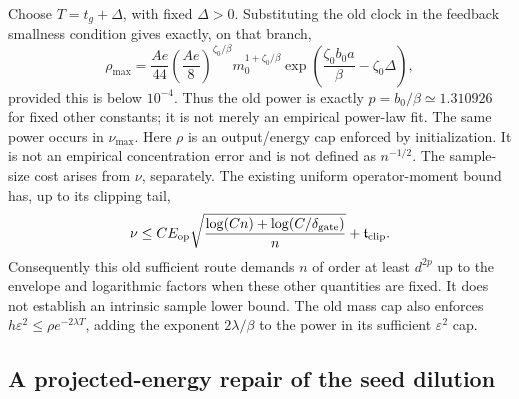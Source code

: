 \documentclass{article} %
\theoremstyle{plain}
\theoremstyle{definition}
\theoremstyle{remark}
\begin{document}
Choose $T=t_g+\Delta$, with fixed $\Delta>0$. Substituting the old clock
in the feedback smallness condition gives exactly, on that branch,
\begin{equation}\label{sbguard:old-rho}
 \rho_{\max}=
 \frac{Ae}{44}\left(\frac{Ae}{8}\right)^{\zeta_0/\beta}
 m_0^{1+\zeta_0/\beta}
 \exp\left(\frac{\zeta_0b_0a}{\beta}-\zeta_0\Delta\right),
\end{equation}
provided this is below $10^{-4}$. Thus the old power is exactly
$p=b_0/\beta\simeq1.310926$ for fixed other constants; it is not merely
an empirical power-law fit. The same power occurs in $\nu_{\max}$.
Here $\rho$ is an output/energy cap enforced by initialization. It is
not an empirical concentration error and is not defined as $n^{-1/2}$.
The sample-size cost arises from $\nu$, separately. The existing
uniform operator-moment bound has, up to its clipping tail,
\[
 \nu\le C E_{\rm op}
     \sqrt{\frac{\log(Cn)+\log(C/\delta_{\rm gate})}{n}}
                 +\mathfrak t_{\rm clip}.
\]
Consequently this old sufficient route demands $n$ of order at least
$d^{2p}$ up to the envelope and logarithmic factors when these other
quantities are fixed. It does not establish an intrinsic sample lower
bound. The old mass cap also enforces
$h\varepsilon^2\le\rho e^{-2\lambda T}$, adding the exponent
$2\lambda/\beta$ to the power in its sufficient $\varepsilon^2$ cap.

\subsection{A projected-energy repair of the seed dilution}
\end{document}
